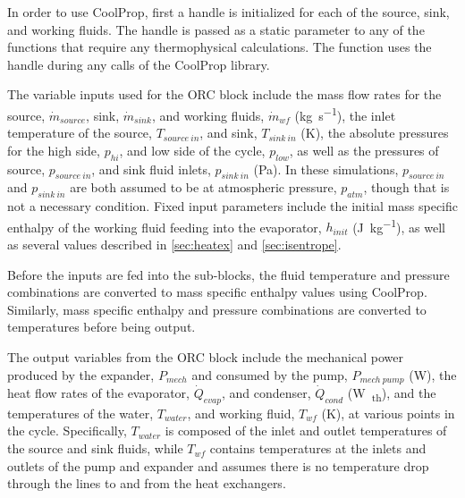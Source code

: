 In order to use CoolProp\textsuperscript{\textcopyright}, first a handle is initialized for each of the source, sink, and working fluids. The handle is passed as a static parameter to any of the functions that require any thermophysical calculations. The function uses the handle during any calls of the CoolProp\textsuperscript{\textcopyright} library.

The variable inputs used for the ORC block include the mass flow rates for the source, $\dot{m}_{source}$, sink, $\dot{m}_{sink}$, and working fluids, $\dot{m}_{wf}$ (\si{\kilogram\per\second}), the inlet temperature of the source, $T_{source\ in}$, and sink, $T_{sink\ in}$ (\si{\kelvin}), the absolute pressures for the high side, $p_{hi}$, and low side of the cycle, $p_{low}$, as well as the pressures of source, $p_{source\ in}$, and sink fluid inlets, $p_{sink\ in}$ (\si{\pascal}). In these simulations, $p_{source\ in}$ and $p_{sink\ in}$ are both assumed to be at atmospheric pressure, $p_{atm}$, though that is not a necessary condition. Fixed input parameters include the initial mass specific enthalpy of the working fluid feeding into the evaporator, $h_{init}$ (\si{\joule\per\kilogram}), as well as several values described in \autoref{sec:heatex} and \autoref{sec:isentrope}.

Before the inputs are fed into the sub-blocks, the fluid temperature and pressure combinations are converted to mass specific enthalpy values using CoolProp\textsuperscript{\textcopyright}. Similarly, mass specific enthalpy and pressure combinations are converted to temperatures before being output.

The output variables from the ORC block include the mechanical power produced by the expander, $P_{mech}$ and consumed by the pump, $P_{mech\ pump}$ (\si{\watt}), the heat flow rates of the evaporator, $\dot{Q}_{evap}$, and condenser, $\dot{Q}_{cond}$ (\si{\watt\textsubscript{th}}), and the temperatures of the water, $T_{water}$, and working fluid, $T_{wf}$ (\si{\kelvin}), at various points in the cycle. Specifically, $T_{water}$ is composed of the inlet and outlet temperatures of the source and sink fluids, while $T_{wf}$ contains temperatures at the inlets and outlets of the pump and expander and assumes there is no temperature drop through the lines to and from the heat exchangers.

